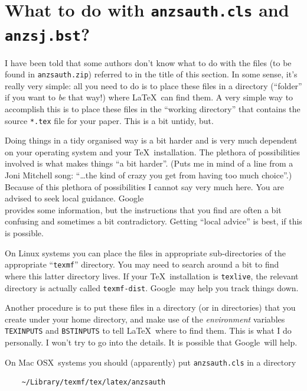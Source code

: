 \documentclass[
  times,
  doublespace]{anzsauth}
\begin{document}
\section{\texorpdfstring{What to do with \texttt{anzsauth.cls} and
\texttt{anzsj.bst}?}{What to do with anzsauth.cls and anzsj.bst?}}\label{sec-wheretoshove}

I have been told that some authors don't know what to do with the files
(to be found in \texttt{anzsauth.zip}) referred to in the title of this
section. In some sense, it's really very simple: all you need to do is
to place these files in a directory (``folder'' if you want to \emph{be}
that way!) where \LaTeX~can find them. A very simple way to accomplish
this is to place these files in the ``working directory'' that contains
the source \texttt{*.tex} file for your paper. This is a bit untidy,
but.

Doing things in a tidy organised way is a bit harder and is very much
dependent on your operating system and your \TeX~installation. The
plethora of possibilities involved is what makes things ``a bit
harder''. (Puts me in mind of a line from a Joni Mitchell song:
``\ldots the kind of crazy you get from having too much choice''.)
Because of this plethora of possibilities I cannot say very much here.
You are advised to seek local guidance. Google\texttrademark\\
provides some information, but the instructions that you find are often
a bit confusing and sometimes a bit contradictory. Getting ``local
advice'' is best, if this is possible.

On Linux systems you can place the files in appropriate sub-directories
of the appropriate ``\texttt{texmf}'' directory. You may need to search
around a bit to find where this latter directory lives. If your
\TeX~installation is \texttt{texlive}, the relevant directory is
actually called \texttt{texmf-dist}. Google\texttrademark~may help you
track things down.

Another procedure is to put these files in a directory (or in
directories) that you create under your home directory, and make use of
the \emph{environment} variables \texttt{TEXINPUTS} and
\texttt{BSTINPUTS} to tell \LaTeX~where to find them. This is what I do
personally. I won't try to go into the details. It is possible that
Google\texttrademark~will help.

On Mac OSX\texttrademark~systems you should (apparently) put
\texttt{anzsauth.cls} in a directory

\begin{verbatim}
    ~/Library/texmf/tex/latex/anzsauth
\end{verbatim}
\end{document}
